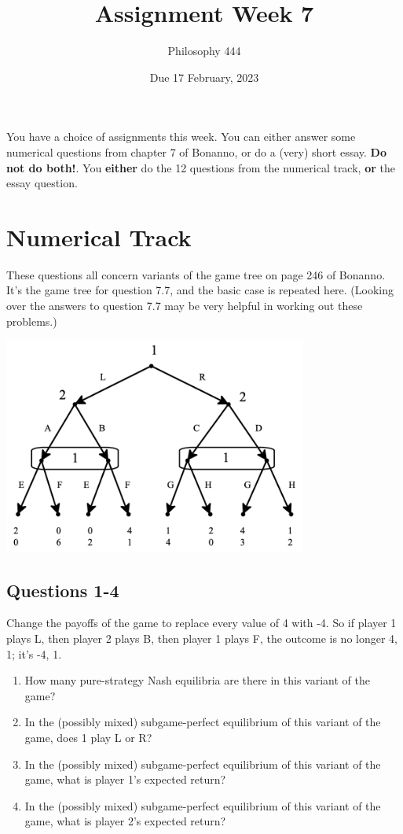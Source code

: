 \documentclass[
  11pt,
]{article}
\title{Assignment Week 7}
\author{Philosophy 444}
\date{Due 17 February, 2023}
\providecommand{\tightlist}{%
  \setlength{\itemsep}{0pt}\setlength{\parskip}{0pt}}
\begin{document}
\maketitle


You have a choice of assignments this week. You can either answer some
numerical questions from chapter 7 of Bonanno, or do a (very) short
essay. \textbf{Do not do both!}. You \textbf{either} do the 12 questions
from the numerical track, \textbf{or} the essay question.

\hypertarget{numerical-track}{%
\section{Numerical Track}\label{numerical-track}}

These questions all concern variants of the game tree on page 246 of
Bonanno. It's the game tree for question 7.7, and the basic case is
repeated here. (Looking over the answers to question 7.7 may be very
helpful in working out these problems.)

\includegraphics[width=0.75\textwidth,height=\textheight]{bonanno-tree.png}

\hypertarget{questions-1-4}{%
\subsection{Questions 1-4}\label{questions-1-4}}

Change the payoffs of the game to replace every value of 4 with -4. So
if player 1 plays L, then player 2 plays B, then player 1 plays F, the
outcome is no longer 4, 1; it's -4, 1.

\begin{enumerate}
\def\labelenumi{\arabic{enumi}.}
\tightlist
\item
  How many pure-strategy Nash equilibria are there in this variant of
  the game?
\item
  In the (possibly mixed) subgame-perfect equilibrium of this variant of
  the game, does 1 play L or R?
\item
  In the (possibly mixed) subgame-perfect equilibrium of this variant of
  the game, what is player 1's expected return?
\item
  In the (possibly mixed) subgame-perfect equilibrium of this variant of
  the game, what is player 2's expected return?
\end{enumerate}
\end{document}
